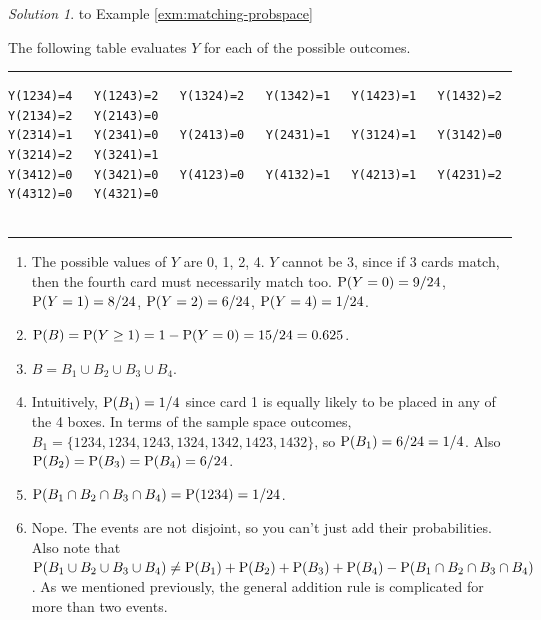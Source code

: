 \documentclass[
]{book}
\providecommand{\tightlist}{%
  \setlength{\itemsep}{0pt}\setlength{\parskip}{0pt}}
\theoremstyle{definition}
\theoremstyle{definition}
\theoremstyle{definition}
\theoremstyle{remark}
\newtheorem*{solution}{Solution}
\begin{document}
\begin{solution}
{}
to Example \ref{exm:matching-probspace}
\end{solution}

The following table evaluates \(Y\) for each of the possible outcomes.

\begin{center}\rule{0.5\linewidth}{0.5pt}\end{center}

\begin{verbatim}
Y(1234)=4   Y(1243)=2   Y(1324)=2   Y(1342)=1   Y(1423)=1   Y(1432)=2   Y(2134)=2   Y(2143)=0
Y(2314)=1   Y(2341)=0   Y(2413)=0   Y(2431)=1   Y(3124)=1   Y(3142)=0   Y(3214)=2   Y(3241)=1
Y(3412)=0   Y(3421)=0   Y(4123)=0   Y(4132)=1   Y(4213)=1   Y(4231)=2   Y(4312)=0   Y(4321)=0
                                               
\end{verbatim}

\begin{center}\rule{0.5\linewidth}{0.5pt}\end{center}

\begin{enumerate}
\def\labelenumi{\arabic{enumi}.}
\tightlist
\item
  The possible values of \(Y\) are 0, 1, 2, 4. \(Y\) cannot be 3, since if 3 cards match, then the fourth card must necessarily match too. \(\textrm{P}(Y=0)=9/24\), \(\textrm{P}(Y=1)=8/24\), \(\textrm{P}(Y=2)=6/24\), \(\textrm{P}(Y=4)=1/24\).
\item
  \(\textrm{P}(B) = \textrm{P}(Y\ge 1) = 1 - \textrm{P}(Y=0) = 15/24 = 0.625\).
\item
  \(B = B_1\cup B_2\cup B_3\cup B_4\).
\item
  Intuitively, \(\textrm{P}(B_1)=1/4\) since card 1 is equally likely to be placed in any of the 4 boxes. In terms of the sample space outcomes, \(B_1 =\{1234, 1234, 1243, 1324, 1342, 1423, 1432\}\), so \(\textrm{P}(B_1)=6/24=1/4\). Also \(\textrm{P}(B_2)=\textrm{P}(B_3)=\textrm{P}(B_4)=6/24\).
\item
  \(\textrm{P}(B_1\cap B_2 \cap B_3 \cap B_4) = \textrm{P}({1234}) = 1/24\).
\item
  Nope. The events are not disjoint, so you can't just add their probabilities. Also note that \(\textrm{P}(B_1\cup B_2 \cup B_3\cup B_4)\neq \textrm{P}(B_1)+\textrm{P}(B_2)+\textrm{P}(B_3)+\textrm{P}(B_4)-\textrm{P}(B_1\cap B_2 \cap B_3 \cap B_4)\). As we mentioned previously, the general addition rule is complicated for more than two events.
\end{enumerate}
\end{document}
